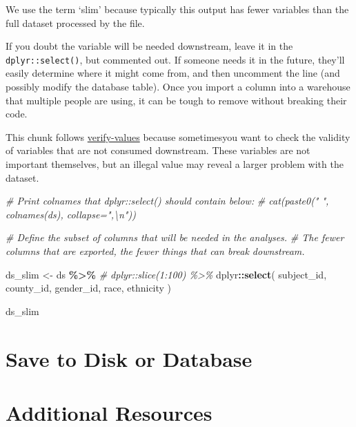 \documentclass[
]{book}
\newenvironment{Shaded}{\begin{snugshade}}{\end{snugshade}}
\newcommand{\CommentTok}[1]{\textcolor[rgb]{0.56,0.35,0.01}{\textit{#1}}}
\newcommand{\KeywordTok}[1]{\textcolor[rgb]{0.13,0.29,0.53}{\textbf{#1}}}
\newcommand{\NormalTok}[1]{#1}
\newcommand{\OperatorTok}[1]{\textcolor[rgb]{0.81,0.36,0.00}{\textbf{#1}}}
\newcommand{\StringTok}[1]{\textcolor[rgb]{0.31,0.60,0.02}{#1}}
\begin{document}
We use the term `slim' because typically this output has fewer variables than the full dataset processed by the file.

If you doubt the variable will be needed downstream, leave it in the \texttt{dplyr::select()}, but commented out. If someone needs it in the future, they'll easily determine where it might come from, and then uncomment the line (and possibly modify the database table). Once you import a column into a warehouse that multiple people are using, it can be tough to remove without breaking their code.

This chunk follows \protect\hyperlink{chunk-verify-values}{verify-values} because sometimesyou want to check the validity of variables that are not consumed downstream. These variables are not important themselves, but an illegal value may reveal a larger problem with the dataset.

\begin{Shaded}
\begin{Highlighting}[]
\CommentTok{\# Print colnames that \textasciigrave{}dplyr::select()\textasciigrave{}  should contain below:}
\CommentTok{\#   cat(paste0("    ", colnames(ds), collapse=",\textbackslash{}n"))}

\CommentTok{\# Define the subset of columns that will be needed in the analyses.}
\CommentTok{\#   The fewer columns that are exported, the fewer things that can break downstream.}

\NormalTok{ds\_slim <{-}}
\StringTok{  }\NormalTok{ds }\OperatorTok{\%>\%}
\StringTok{  }\CommentTok{\# dplyr::slice(1:100) \%>\%}
\StringTok{  }\NormalTok{dplyr}\OperatorTok{::}\KeywordTok{select}\NormalTok{(}
\NormalTok{    subject\_id,}
\NormalTok{    county\_id,}
\NormalTok{    gender\_id,}
\NormalTok{    race,}
\NormalTok{    ethnicity}
\NormalTok{  )}

\NormalTok{ds\_slim}
\end{Highlighting}
\end{Shaded}

\hypertarget{save-to-disk-or-database}{%
\section{Save to Disk or Database}\label{save-to-disk-or-database}}

\hypertarget{additional-resources}{%
\section{Additional Resources}\label{additional-resources}}
\end{document}
